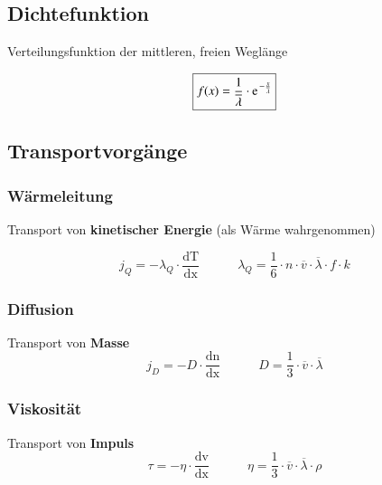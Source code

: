 \subsection{Dichtefunktion}

\begin{minipage}[c]{0.58\columnwidth}
	Verteilungsfunktion der mittleren, freien Weglänge 
\end{minipage}
\hfill
\begin{minipage}[c]{0.38\columnwidth}
	$$ \boxed{ f(x) = \frac{1}{\overline{\lambda}} \cdot \e^{- \frac{x}{\overline{\lambda}}}  } $$
\end{minipage}


\subsection{Transportvorgänge}

\subsubsection{Wärmeleitung}

Transport von \textbf{kinetischer Energie} (als Wärme wahrgenommen)

$$ \boxed{ j_Q = - \lambda_Q \cdot \frac{\mathrm{dT}}{\mathrm{dx}} \qquad \quad \lambda_Q = \frac{1}{6} \cdot n \cdot \overline{v} \cdot \overline{\lambda} \cdot f \cdot k }  $$

\medskip

\begin{minipage}[c]{0.48\columnwidth}
	\subsubsection{Diffusion}

	Transport von \textbf{Masse} 
	$$ \boxed{ j_D = -D \cdot \frac{\mathrm{dn}}{\mathrm{dx}} \qquad \quad  D = \frac{1}{3} \cdot \overline{v} \cdot \overline{\lambda} }  $$
\end{minipage}
\hfill
\begin{minipage}[c]{0.48\columnwidth}
	\subsubsection{Viskosität}

	Transport von \textbf{Impuls} 
	$$ \boxed{ \tau = - \eta \cdot \frac{\mathrm{dv}}{\mathrm{dx}} \qquad \quad  
	\eta = \frac{1}{3} \cdot \overline{v} \cdot \overline{\lambda} \cdot \rho }  $$
\end{minipage}

